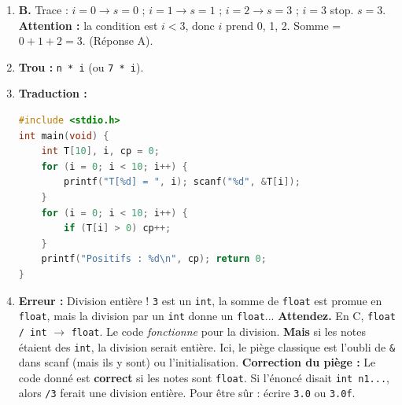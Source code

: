 \documentclass[11pt]{article}
\begin{document}
\begin{corrige}
\begin{enumerate}
\item \textbf{B.} Trace : $i=0 \to s=0$ ; $i=1 \to s=1$ ; $i=2 \to s=3$ ; $i=3$ stop. $s=3$. \textbf{Attention :} la condition est $i < 3$, donc $i$ prend 0, 1, 2. Somme = $0+1+2=3$. (Réponse A).
\item \textbf{Trou :} \texttt{n * i} (ou \texttt{7 * i}).
\item \textbf{Traduction :}
\begin{lstlisting}[language=C]
#include <stdio.h>
int main(void) {
    int T[10], i, cp = 0;
    for (i = 0; i < 10; i++) {
        printf("T[%d] = ", i); scanf("%d", &T[i]);
    }
    for (i = 0; i < 10; i++) {
        if (T[i] > 0) cp++;
    }
    printf("Positifs : %d\n", cp); return 0;
}
\end{lstlisting}
\item \textbf{Erreur :} Division entière ! \texttt{3} est un \texttt{int}, la somme de \texttt{float} est promue en \texttt{float}, mais la division par un \texttt{int} donne un \texttt{float}... \textbf{Attendez.} En C, \texttt{float / int} $\to$ \texttt{float}. Le code \emph{fonctionne} pour la division. \textbf{Mais} si les notes étaient des \texttt{int}, la division serait entière. Ici, le piège classique est l'oubli de \texttt{\&} dans scanf (mais ils y sont) ou l'initialisation. \textbf{Correction du piège :} Le code donné est \textbf{correct} si les notes sont \texttt{float}. Si l'énoncé disait \texttt{int n1...}, alors \texttt{/3} ferait une division entière. Pour être sûr : écrire \texttt{3.0} ou \texttt{3.0f}.
\end{enumerate}
\end{corrige}
\end{document}

